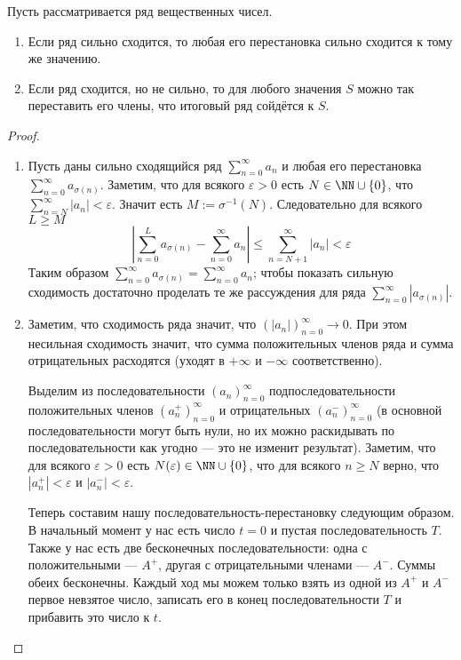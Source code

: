 \documentclass[12pt,a4paper]{article}
\begin{document}
    \begin{theorem}
        Пусть рассматривается ряд вещественных чисел.
        \begin{enumerate}
            \item Если ряд сильно сходится, то любая его перестановка сильно сходится к тому же значению.
            \item Если ряд сходится, но не сильно, то для любого значения $S$ можно так переставить его члены, что итоговый ряд сойдётся к $S$.
        \end{enumerate}
    \end{theorem}

    \begin{proof}\ 
        \begin{enumerate}
            \item Пусть даны сильно сходящийся ряд $\sum_{n=0}^\infty a_n$ и любая его перестановка $\sum_{n=0}^\infty a_{\sigma(n)}$. Заметим, что для всякого $\varepsilon > 0$ есть $N \in \NN \cup \{0\}$, что $\sum_{n=N}^\infty |a_n| < \varepsilon$. Значит есть $M := \sigma^{-1}(N)$. Следовательно для всякого $L \geqslant M$
            \[
                \left|\sum_{n=0}^L a_{\sigma(n)} - \sum_{n=0}^\infty a_n\right|
                \leqslant \sum_{n=N+1}^\infty |a_n| < \varepsilon
            \]
            Таким образом $\sum_{n=0}^\infty a_{\sigma(n)} = \sum_{n=0}^\infty a_n$; чтобы показать сильную сходимость достаточно проделать те же рассуждения для ряда $\sum_{n=0}^\infty |a_{\sigma(n)}|$.

            \item Заметим, что сходимость ряда значит, что $(|a_n|)_{n=0}^\infty \to 0$. При этом несильная сходимость значит, что сумма положительных членов ряда и сумма отрицательных расходятся (уходят в $+\infty$ и $-\infty$ соответственно).
            
            Выделим из последовательности $(a_n)_{n=0}^\infty$ подпоследовательности положительных членов $(a^+_n)_{n=0}^\infty$ и отрицательных $(a^-_n)_{n=0}^\infty$ (в основной последовательности могут быть нули, но их можно раскидывать по последовательности как угодно --- это не изменит результат). Заметим, что для всякого $\varepsilon > 0$ есть $N(\varepsilon) \in \NN \cup \{0\}$, что для всякого $n \geqslant N$ верно, что $|a^+_n| < \varepsilon$ и $|a^-_n| < \varepsilon$.

            Теперь составим нашу последовательность-перестановку следующим образом. В начальный момент у нас есть число $t = 0$ и пустая последовательность $T$. Также у нас есть две бесконечных последовательности: одна с положительными --- $A^+$, другая с отрицательными членами --- $A^-$. Суммы обеих бесконечны. Каждый ход мы можем только взять из одной из $A^+$ и $A^-$ первое невзятое число, записать его в конец последовательности $T$ и прибавить это число к $t$.
            

\end{enumerate}
\end{proof}
\end{document}
